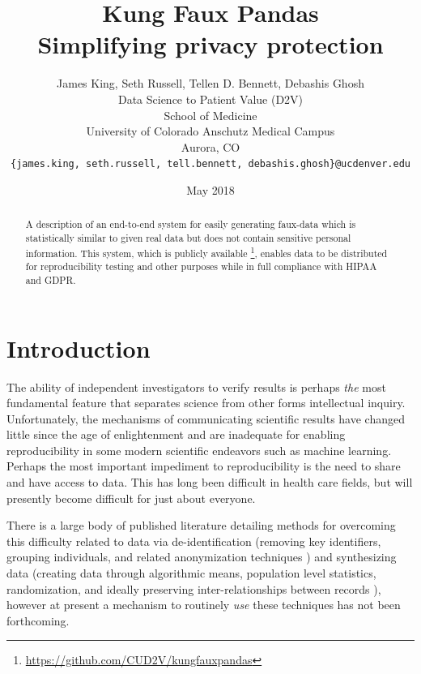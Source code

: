 \documentclass{article}
\title{%
  Kung Faux Pandas \\
  \large Simplifying privacy protection
  }
\author{
  James King, Seth Russell, Tellen D. Bennett, Debashis Ghosh\\
  Data Science to Patient Value (D2V)\\
  School of Medicine\\
  University of Colorado Anschutz Medical Campus\\
  Aurora, CO\\
  \texttt{\{james.king, seth.russell, tell.bennett, debashis.ghosh\}@ucdenver.edu}
  }
\date{May 2018}
\begin{document}

\maketitle

\begin{abstract}
A description of an end-to-end system for easily generating faux-data which is statistically similar to given real data but does not contain sensitive personal information. This system, which is publicly available \footnote{\url{https://github.com/CUD2V/kungfauxpandas}}, enables data to be distributed for reproducibility testing and other purposes while in full compliance with HIPAA and GDPR.
\end{abstract}

\section{Introduction}

The ability of independent investigators to verify results is perhaps \emph{the} most fundamental feature that separates science from other forms intellectual inquiry. Unfortunately, the mechanisms of communicating scientific results have changed little since the age of enlightenment and are inadequate for enabling reproducibility in some modern scientific endeavors such as machine learning. Perhaps the most important impediment to reproducibility is the need to share and have access to data. This has long been difficult in health care fields, but will presently become difficult for just about everyone.

There is a large body of published literature detailing methods for overcoming this difficulty related to data via de-identification (removing key identifiers, grouping individuals, and related anonymization techniques \cite{hippapro}) and synthesizing data (creating data through algorithmic means, population level statistics, randomization, and ideally preserving inter-relationships between records \cite{walonoski_synthea_2018, patki_synthetic_2016, choi_generating_2017}), however at present a mechanism to routinely \emph{use} these techniques has not been forthcoming.
\end{document}
